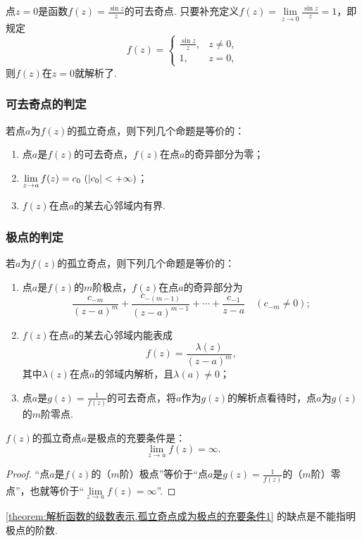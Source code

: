 \begin{example}
点\(z=0\)是函数\(f(z) = \frac{\sin z}{z}\)的可去奇点.
只要补充定义\(f(z) = \lim\limits_{z\to0} \frac{\sin z}{z} = 1\)，即规定\[
f(z) = \left\{ \begin{array}{cc}
\frac{\sin z}{z}, & z\neq0, \\
1, & z=0,
\end{array} \right.
\]则\(f(z)\)在\(z=0\)就解析了.
\end{example}

\subsubsection{可去奇点的判定}
\begin{theorem}\label{theorem:解析函数的级数表示.可去奇点的特征}
若点\(a\)为\(f(z)\)的孤立奇点，则下列几个命题是等价的：
\begin{enumerate}
\item 点\(a\)是\(f(z)\)的可去奇点，\(f(z)\)在点\(a\)的奇异部分为零；
\item \(\lim\limits_{z \to a} f(z) = c_0\ (\abs{c_0} < +\infty)\)；
\item \(f(z)\)在点\(a\)的某去心邻域内有界.
\end{enumerate}
\end{theorem}

\subsubsection{极点的判定}
\begin{theorem}\label{theorem:解析函数的级数表示.极点的特征}
若\(a\)为\(f(z)\)的孤立奇点，则下列几个命题是等价的：
\begin{enumerate}
\item 点\(a\)是\(f(z)\)的\(m\)阶极点，\(f(z)\)在点\(a\)的奇异部分为\[
\frac{c_{-m}}{(z-a)^m} + \frac{c_{-(m-1)}}{(z-a)^{m-1}} + \dotsb + \frac{c_{-1}}{z-a}
\quad(c_{-m}\neq0);
\]

\item \(f(z)\)在点\(a\)的某去心邻域内能表成\[
f(z) = \frac{\lambda(z)}{(z-a)^m},
\]其中\(\lambda(z)\)在点\(a\)的邻域内解析，且\(\lambda(a)\neq0\)；

\item 点\(a\)是\(g(z) = \frac{1}{f(z)}\)的可去奇点，将\(a\)作为\(g(z)\)的解析点看待时，点\(a\)为\(g(z)\)的\(m\)阶零点.
\end{enumerate}
\end{theorem}

\begin{corollary}\label{theorem:解析函数的级数表示.孤立奇点成为极点的充要条件1}
\(f(z)\)的孤立奇点\(a\)是极点的充要条件是：\[
\lim\limits_{z \to a} f(z) = \infty.
\]
\begin{proof}
“点\(a\)是\(f(z)\)的（\(m\)阶）极点”等价于“点\(a\)是\(g(z) = \frac{1}{f(z)}\)的（\(m\)阶）零点”，也就等价于“\(\lim\limits_{z \to a} f(z) = \infty\)”.
\end{proof}
\end{corollary}
\cref{theorem:解析函数的级数表示.孤立奇点成为极点的充要条件1} 的缺点是不能指明极点的阶数.


